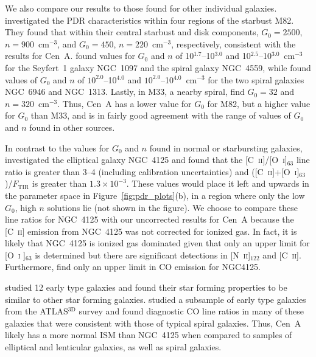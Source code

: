 We also compare our results to those found for other individual galaxies.  \citet{2013A&A...549A.118C} investigated the PDR characteristics within four regions of the starbust M82.  They found that within their central starbust and disk components, $G_{0} = 2500$, $n = 900$~cm$^{-3}$, and $G_{0} = 450$, $n = 220$~cm$^{-3}$, respectively, consistent with the results for Cen~A.  \citet{2012ApJ...747...81C} found values for $G_{0}$ and $n$ of 10$^{1.7}$--10$^{3.0}$ and 10$^{2.5}$--10$^{3.0}$~cm$^{-3}$ for the Seyfert~1 galaxy NGC~1097 and the spiral galaxy NGC~4559, while \citet{2002AJ....124..751C} found values of $G_{0}$ and $n$ of $10^{2.0}$--10$^{4.0}$  and $10^{2.0}$--10$^{4.0}$~cm$^{-3}$ for the two spiral galaxies NGC~6946 and NGC~1313.  Lastly, in M33, a nearby spiral, \citet{2011A&A...532A.152M} find $G_{0} = 32$ and $n = 320$~cm$^{-3}$.  Thus, Cen~A has a lower value for $G_{0}$ for M82, but a higher value for $G_{0}$ than M33, and is in fairly good agreement with the range of values of $G_{0}$ and $n$ found in other sources.

In contrast to the values for $G_{0}$ and $n$ found in normal or starbursting galaxies, \citet{Wilson_2013} investigated the elliptical galaxy NGC~4125 and found that the [C~\textsc{ii}]/[O~\textsc{i}]$_{63}$ line ratio is greater than 3--4 (including calibration uncertainties) and ([C~\textsc{ii}]+[O~\textsc{i}]$_{63}$)/$F_{\mathrm{TIR}}$ is greater than $1.3 \times 10^{-3}$.  These values would place it left and upwards in the parameter space in Figure~\ref{fig:pdr_plots}(b), in a region where only the low $G_{0}$, high $n$ solutions lie (not shown in the figure).  We choose to compare these line ratios for NGC~4125 with our uncorrected results for Cen~A because the [C~\textsc{ii}] emission from NGC~4125 was not corrected for ionized gas.  In fact, it is likely that NGC~4125 is ionized gas dominated given that only an upper limit for [O~\textsc{i} ]$_{63}$ is determined but there are significant detections in [N~\textsc{ii}]$_{122}$ and [C~\textsc{ii}].  Furthermore, \citet{2010ApJ...725..100W} find only an upper limit in CO emission for NGC4125.

\citet{2011MNRAS.410.1197C} studied 12 early type galaxies and found their star forming properties to be similar to other star forming galaxies.  \citet{2012MNRAS.421.1298C} studied a subsample of early type galaxies from the ATLAS$^{3\mathrm{D}}$ survey \citep{2011MNRAS.414..940Y} and found diagnostic CO line ratios in many of these galaxies that were consistent with those of typical spiral galaxies.   Thus, Cen~A likely has a more normal ISM than NGC~4125 when compared to samples of elliptical and lenticular galaxies, as well as spiral galaxies.  

